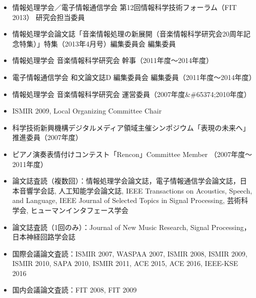 \begin{itemize}
\item 
情報処理学会／電子情報通信学会 第12回情報科学技術フォーラム（FIT 2013） 研究会担当委員\par

\item 
情報処理学会論文誌「音楽情報処理の新展開（音楽情報科学研究会20周年記念特集）」特集（2013年4月号）編集委員会 編集委員\par

\item 
情報処理学会 音楽情報科学研究会 幹事（2011年度〜2014年度）\par

\item 
電子情報通信学会 和文論文誌D 編集委員会 編集委員（2011年度〜2014年度）\par

\item 
情報処理学会 音楽情報科学研究会 運営委員（2007年度\&\#65374;2010年度）\par

\item 
ISMIR 2009, Local Organizing Committee Chair\par

\item 
科学技術新興機構デジタルメディア領域主催シンポジウム「表現の未来へ」推進委員（2007年度）\par

\item 
ピアノ演奏表情付けコンテスト「Rencon」Committee Member （2007年度〜2011年度）\par

\item 
論文誌査読（複数回）：情報処理学会論文誌，電子情報通信学会論文誌，日本音響学会誌, 人工知能学会論文誌, IEEE Transactions on Acoustics, Speech, and Language, IEEE Journal of Selected Topics in Signal Processing, 芸術科学会, ヒューマンインタフェース学会\par

\item 
論文誌査読（1回のみ）：Journal of New Music Research, Signal Processing，日本神経回路学会誌\par

\item 
国際会議論文査読：ISMIR 2007, WASPAA 2007, ISMIR 2008, ISMIR 2009, ISMIR 2010, SAPA 2010, ISMIR 2011, ACE 2015, ACE 2016, IEEE-KSE 2016\par

\item 
国内会議論文査読：FIT 2008, FIT 2009\par

\end{itemize}


